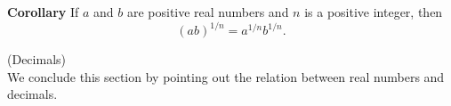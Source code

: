 \textbf{Corollary} 
If $a$ and $b$ are positive real numbers 
and $n$ is a positive integer, 
then
\begin{equation*}
    (ab)^{1/n}= a^{1/n}b^{1/n}.
\end{equation*}

\begin{myDef}
    \label{myDef:1.22}
    (Decimals)\\
    We conclude this section by pointing out the relation between real numbers and decimals.
\end{myDef}

